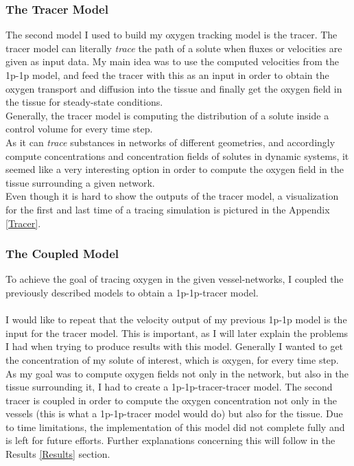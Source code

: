 \subsubsection*{The Tracer Model}

The second model I used to build my oxygen tracking model is the tracer. The tracer model can literally \emph{trace} the path of a solute when fluxes or velocities are given as input data. My main idea was to use the computed velocities from the 1p-1p model, and feed the tracer with this as an input in order to obtain the oxygen transport and diffusion into the tissue and finally get the oxygen field in the tissue for steady-state conditions.
\\Generally, the tracer model is computing the distribution of a solute inside a control volume for every time step.
\\As it can \emph{trace} substances in networks of different geometries, and accordingly compute concentrations and concentration fields of solutes in dynamic systems, it seemed like a very interesting option in order to compute the oxygen field in the tissue surrounding a given network.
\\Even though it is hard to show the outputs of the tracer model, a visualization for the first and last time of a tracing simulation is pictured in the Appendix \ref{Tracer}.\\

\newpage
\subsubsection*{The Coupled Model}

To achieve the goal of tracing oxygen in the given vessel-networks, I coupled the previously described models to obtain a 1p-1p-tracer model.\\
\\I would like to repeat that the velocity output of my previous 1p-1p model is the input for the tracer model. This is important, as I will later explain the problems I had when trying to produce results with this model. Generally I wanted to get the concentration of my solute of interest, which is oxygen, for every time step.
\\As my goal was to compute oxygen fields not only in the network, but also in the tissue surrounding it, I had to create a 1p-1p-tracer-tracer model. The second tracer is coupled in order to compute the oxygen concentration not only in the vessels (this is what a 1p-1p-tracer model would do) but also for the tissue. Due to time limitations, the implementation of this model did not complete fully and is left for future efforts. Further explanations concerning this will follow in the Results \ref{Results} section.

